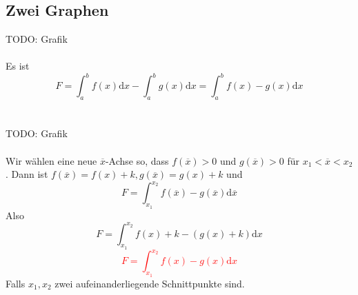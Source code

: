 \documentclass{report}
\begin{document}
\subsection{Zwei Graphen}
TODO: Grafik\\\\
Es ist
\begin{equation}F = \int_a^b f(x) \mathrm{d}x - \int_a^b g(x) \mathrm{d}x = \int_a^b f(x)-g(x) \mathrm{d}x\end{equation}
\\\\TODO: Grafik\\\\
Wir wählen eine neue $\overline{x}$-Achse so, dass $f(\overline{x}) > 0$ und $g(\overline{x}) > 0$ für $x_1 < \overline{x} < x_2$. Dann ist $f(\overline{x}) = f(x) + k, g(\overline{x}) = g(x) + k$ und
\begin{equation}F = \int_{x_1}^{x_2} f(\overline{x}) - g(\overline{x}) \mathrm{d}\overline{x}\end{equation}
Also
\begin{equation}F = \int_{x_1}^{x_2} f(x)+k - (g(x) + k) \mathrm{d}x\end{equation}
\textcolor{red}{\begin{equation}F = \int_{x_1}^{x_2} f(x) - g(x) \mathrm{d}x\end{equation}}
Falls $x_1, x_2$ zwei aufeinanderliegende Schnittpunkte sind.
\end{document}
